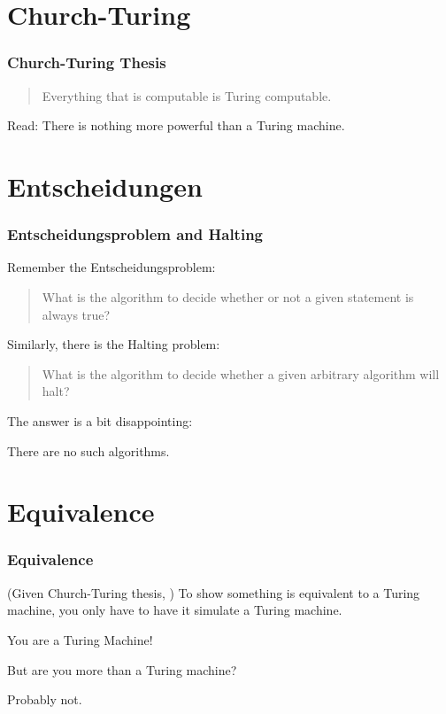 \documentclass[mathserif]{beamer}
\begin{document}
\section{Church-Turing}
\begin{frame}
  \frametitle{Church-Turing Thesis}

  \begin{quote}
    Everything that is computable is Turing computable.
  \end{quote}

  Read: There is nothing more powerful than a Turing machine.
\end{frame}

\section{Entscheidungen}
\begin{frame}
  \frametitle{Entscheidungsproblem and Halting}

  Remember the Entscheidungsproblem:
  \begin{quote}
    What is the algorithm to decide whether or not a given statement is always
    true?
  \end{quote}

  Similarly, there is the Halting problem:
  \begin{quote}
    What is the algorithm to decide whether a given arbitrary algorithm will
    halt?
  \end{quote}

  The answer is a bit disappointing:

  {\Large There are no such algorithms.}

\end{frame}

\section{Equivalence}
\begin{frame}
  \frametitle{Equivalence}

  \begin{center}
    (Given Church-Turing thesis, ) To show something is equivalent to a Turing
    machine, you only have to have it simulate a Turing machine.

    \vspace{10mm}

    {\Large You are a Turing Machine!

    But are you more than a Turing machine?}

    {\small Probably not.}
  \end{center}
\end{frame}
\end{document}
